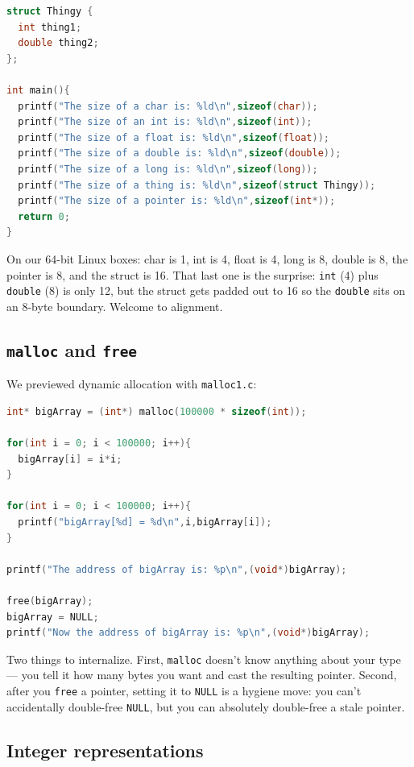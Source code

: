 \documentclass[11pt]{article}
\begin{document}
\begin{lstlisting}[language=C]
struct Thingy {
  int thing1;
  double thing2;
};

int main(){
  printf("The size of a char is: %ld\n",sizeof(char));
  printf("The size of an int is: %ld\n",sizeof(int));
  printf("The size of a float is: %ld\n",sizeof(float));
  printf("The size of a double is: %ld\n",sizeof(double));
  printf("The size of a long is: %ld\n",sizeof(long));
  printf("The size of a thing is: %ld\n",sizeof(struct Thingy));
  printf("The size of a pointer is: %ld\n",sizeof(int*));
  return 0;
}
\end{lstlisting}

On our 64-bit Linux boxes: char is 1, int is 4, float is 4, long is 8,
double is 8, the pointer is 8, and the struct is 16. That last one is
the surprise: \texttt{int} (4) plus \texttt{double} (8) is only 12,
but the struct gets padded out to 16 so the \texttt{double} sits on an
8-byte boundary. Welcome to alignment.

\subsection*{\texttt{malloc} and \texttt{free}}

We previewed dynamic allocation with \texttt{malloc1.c}:

\begin{lstlisting}[language=C]
int* bigArray = (int*) malloc(100000 * sizeof(int));

for(int i = 0; i < 100000; i++){
  bigArray[i] = i*i;
}

for(int i = 0; i < 100000; i++){
  printf("bigArray[%d] = %d\n",i,bigArray[i]);
}

printf("The address of bigArray is: %p\n",(void*)bigArray);

free(bigArray);
bigArray = NULL;
printf("Now the address of bigArray is: %p\n",(void*)bigArray);
\end{lstlisting}

Two things to internalize. First, \texttt{malloc} doesn't know
anything about your type --- you tell it how many bytes you want and
cast the resulting pointer. Second, after you \texttt{free} a pointer,
setting it to \texttt{NULL} is a hygiene move: you can't accidentally
double-free \texttt{NULL}, but you can absolutely double-free a stale
pointer.

\subsection*{Integer representations}
\end{document}
